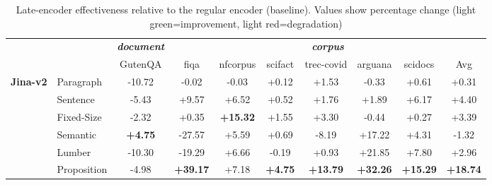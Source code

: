 \begin{table}[htbp]
	\centering
	\caption{Late-encoder effectiveness relative to the regular encoder (baseline). Values show percentage change (light green=improvement, light red=degradation)}
	\label{tab:encoder_comparison}
	\begin{tabular}{llcccccccc}
		\toprule
		&  & \multicolumn{1}{c}{\textbf{\textit{document}}} & \multicolumn{7}{c}{\textbf{\textit{corpus}}} \\
		\cmidrule(lr){3-3} \cmidrule(lr){4-10}
		&  & GutenQA & fiqa & nfcorpus & scifact & trec-covid & arguana & scidocs & Avg \\
		\midrule
		\multirow{6}{*}{\textbf{Jina-v2}} & Paragraph & \cellcolor{lightred}-10.72 & \cellcolor{lightred}-0.02 & \cellcolor{lightred}-0.03 & \cellcolor{lightgreen}+0.12 & \cellcolor{lightgreen}+1.53 & \cellcolor{lightred}-0.33 & \cellcolor{lightgreen}+0.61 & \cellcolor{lightgreen}+0.31 \\
		& Sentence & \cellcolor{lightred}-5.43 & \cellcolor{lightgreen}+9.57 & \cellcolor{lightgreen}+6.52 & \cellcolor{lightgreen}+0.52 & \cellcolor{lightgreen}+1.76 & \cellcolor{lightgreen}+1.89 & \cellcolor{lightgreen}+6.17 & \cellcolor{lightgreen}+4.40 \\
		& Fixed-Size & \cellcolor{lightred}-2.32 & \cellcolor{lightgreen}+0.35 & \cellcolor{lightgreen}\textbf{+15.32} & \cellcolor{lightgreen}+1.55 & \cellcolor{lightgreen}+3.30 & \cellcolor{lightred}-0.44 & \cellcolor{lightgreen}+0.27 & \cellcolor{lightgreen}+3.39 \\
		& Semantic & \cellcolor{lightgreen}\textbf{+4.75} & \cellcolor{lightred}-27.57 & \cellcolor{lightgreen}+5.59 & \cellcolor{lightgreen}+0.69 & \cellcolor{lightred}-8.19 & \cellcolor{lightgreen}+17.22 & \cellcolor{lightgreen}+4.31 & \cellcolor{lightred}-1.32 \\
		& Lumber & \cellcolor{lightred}-10.30 & \cellcolor{lightred}-19.29 & \cellcolor{lightgreen}+6.66 & \cellcolor{lightred}-0.19 & \cellcolor{lightgreen}+0.93 & \cellcolor{lightgreen}+21.85 & \cellcolor{lightgreen}+7.80 & \cellcolor{lightgreen}+2.96 \\
		& Proposition & \cellcolor{lightred}-4.98 & \cellcolor{lightgreen}\textbf{+39.17} & \cellcolor{lightgreen}+7.18 & \cellcolor{lightgreen}\textbf{+4.75} & \cellcolor{lightgreen}\textbf{+13.79} & \cellcolor{lightgreen}\textbf{+32.26} & \cellcolor{lightgreen}\textbf{+15.29} & \cellcolor{lightgreen}\textbf{+18.74} \\

\end{tabular}
\end{table}
